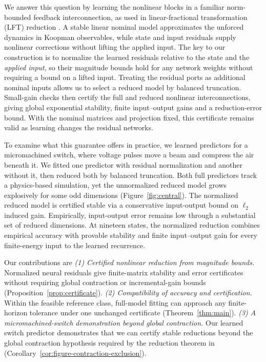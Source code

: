 \documentclass{l4dc2027}
\begin{document}
We answer this question by learning the nonlinear blocks in a familiar norm-bounded feedback interconnection, as used in linear-fractional transformation (LFT) reduction \citep{brown-gramians,beck-lft}.
A stable linear nominal model approximates the unforced dynamics in Koopman observables, while state and input residuals supply nonlinear corrections without lifting the applied input.
The key to our construction is to normalize the learned residuals relative to the state and the \emph{applied input}, so their magnitude bounds hold for any network weights without requiring a bound on a lifted input.
Treating the residual ports as additional nominal inputs allows us to select a reduced model by balanced truncation.
Small-gain checks then certify the full and reduced nonlinear interconnections, giving global exponential stability, finite input--output gains and a reduction-error bound.
With the nominal matrices and projection fixed, this certificate remains valid as learning changes the residual networks.

To examine what this guarantee offers in practice, we learned predictors for a micromachined switch, where voltage pulses move a beam and compress the air beneath it.
We fitted one predictor with residual normalization and another without it, then reduced both by balanced truncation.
Both full predictors track a physics-based simulation, yet the unnormalized reduced model grows explosively for some odd dimensions (Figure~\ref{fig:central}).
The normalized reduced model is certified stable via a conservative input-output bound on $\ell_2$ induced gain.
Empirically, input-output error remains low through a substantial set of reduced dimensions.
At nineteen states, the normalized reduction combines empirical accuracy with provable stability and finite input--output gain for every finite-energy input to the learned recurrence.

Our contributions are
\emph{(1) Certified nonlinear reduction from magnitude bounds.}
Normalized neural residuals give finite-matrix stability and error certificates without requiring global contraction or incremental-gain bounds (Proposition~\ref{prop:certificate}).
\emph{(2) Compatibility of accuracy and certification.}
Within the feasible reference class, full-model fitting can approach any finite-horizon tolerance under one unchanged certificate (Theorem~\ref{thm:main}).
\emph{(3) A micromachined-switch demonstration beyond global contraction.}
Our learned switch predictor demonstrates that we can certify stable reductions beyond the global contraction hypothesis required by the reduction theorem in \citet{shakib-ren} (Corollary~\ref{cor:figure-contraction-exclusion}).
\end{document}
